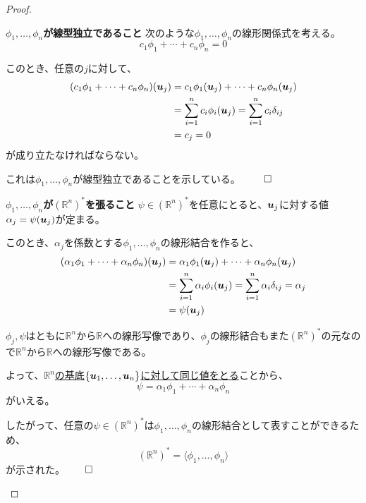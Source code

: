 \documentclass[../../../topic_linear-algebra]{subfiles}
\begin{document}
\begin{proof}
  \begin{subpattern}{\bfseries $\phi_1, \ldots, \phi_n$が線型独立であること}
    次のような$\phi_1, \ldots, \phi_n$の線形関係式を考える。
    \begin{equation*}
      c_1 \phi_1 + \cdots + c_n \phi_n = 0
    \end{equation*}
    
    このとき、任意の$j$に対して、
    \begin{align*}
      (c_1 \phi_1 + \cdots + c_n \phi_n)(\vb*{u}_j) &= c_1 \phi_1(\vb*{u}_j) + \cdots + c_n \phi_n(\vb*{u}_j) \\
      &= \sum_{i=1}^n c_i \phi_i(\vb*{u}_j) = \sum_{i=1}^n c_i \delta_{ij} \\
      &= c_j = 0
    \end{align*}
    が成り立たなければならない。
    
    これは$\phi_1, \ldots, \phi_n$が線型独立であることを示している。 $\qed$
  \end{subpattern}
  
  \begin{subpattern}{\bfseries $\phi_1, \ldots, \phi_n$が$(\mathbb{R}^n)^*$を張ること}
    $\psi \in (\mathbb{R}^n)^*$を任意にとると、$\vb*{u}_j$に対する値$\alpha_j = \psi(\vb*{u}_j)$が定まる。
    
    \br
    
    このとき、$\alpha_j$を係数とする$\phi_1, \ldots, \phi_n$の線形結合を作ると、
    \begin{align*}
      (\alpha_1 \phi_1 + \cdots + \alpha_n \phi_n)(\vb*{u}_j) &= \alpha_1 \phi_1(\vb*{u}_j) + \cdots + \alpha_n \phi_n(\vb*{u}_j) \\
      &= \sum_{i=1}^n \alpha_i \phi_i(\vb*{u}_j) = \sum_{i=1}^n \alpha_i \delta_{ij} = \alpha_j \\
      &= \psi(\vb*{u}_j)
    \end{align*}
    
    $\phi_j,\psi$はともに$\mathbb{R}^n$から$\mathbb{R}$への線形写像であり、$\phi_j$の線形結合もまた$(\mathbb{R}^n)^*$の元なので$\mathbb{R}^n$から$\mathbb{R}$への線形写像である。
    
    よって、\hyperref[thm:linear-map-equality-on-basis]{$\mathbb{R}^n$の基底$\{\vb*{u}_1, \ldots, \vb*{u}_n\}$に対して同じ値をとる}ことから、
    \begin{equation*}
      \psi = \alpha_1 \phi_1 + \cdots + \alpha_n \phi_n
    \end{equation*}
    がいえる。
    
    \br
    
    したがって、任意の$\psi \in (\mathbb{R}^n)^*$は$\phi_1, \ldots, \phi_n$の線形結合として表すことができるため、
    \begin{equation*}
      (\mathbb{R}^n)^* = \langle \phi_1, \ldots, \phi_n \rangle
    \end{equation*}
    が示された。$\qed$
  \end{subpattern}
\end{proof}
\end{document}
